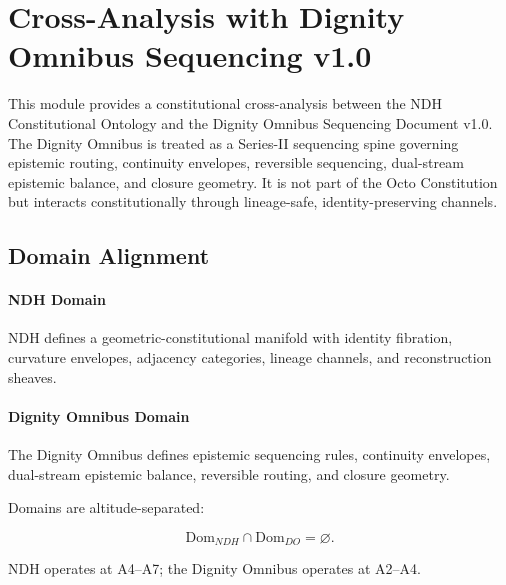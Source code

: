 
\section{Cross-Analysis with Dignity Omnibus Sequencing v1.0}
\label{sec:cross-analysis-dignity-sequencing}

This module provides a constitutional cross-analysis between the NDH
Constitutional Ontology and the Dignity Omnibus Sequencing Document v1.0.
The Dignity Omnibus is treated as a Series-II sequencing spine governing
epistemic routing, continuity envelopes, reversible sequencing, dual-stream
epistemic balance, and closure geometry. It is not part of the Octo
Constitution but interacts constitutionally through lineage-safe,
identity-preserving channels.


\subsection{Domain Alignment}

\paragraph{NDH Domain}
NDH defines a geometric-constitutional manifold with identity fibration,
curvature envelopes, adjacency categories, lineage channels, and
reconstruction sheaves.

\paragraph{Dignity Omnibus Domain}
The Dignity Omnibus defines epistemic sequencing rules, continuity envelopes,
dual-stream epistemic balance, reversible routing, and closure geometry.

Domains are altitude-separated:

\[
\mathrm{Dom}_{NDH} \cap \mathrm{Dom}_{DO} = \varnothing.
\]

NDH operates at A4–A7; the Dignity Omnibus operates at A2–A4.

